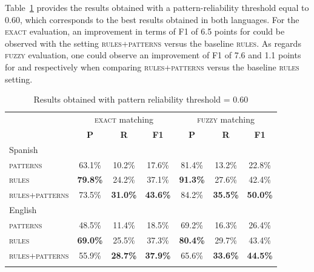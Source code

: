 \documentclass[output=paper]{langsci/langscibook}
\begin{document}
Table~\ref{jac:tab:EvalPatterns} provides the results obtained with a pattern-reliability threshold equal to 0.60, which corresponds to the best results obtained in both languages. For the \textsc{exact} evaluation, an improvement in terms of F1 of 6.5 points for  could be observed with the setting \textsc{rules+patterns} versus the baseline \textsc{rules}. As regards \textsc{fuzzy} evaluation, one could observe an improvement of F1 of 7.6 and 1.1 points for  and  respectively when comparing \textsc{rules+patterns} versus the baseline \textsc{rules} setting.


\begin{table}[h]
\begin{tabular}{l ccc ccc}\lsptoprule
&     \multicolumn{3}{c}{\textsc{exact} matching}  & \multicolumn{3}{c}{\textsc{fuzzy} matching}  \\\cmidrule(lr){2-4}\cmidrule(lr){5-7}
&  \textbf{P}  & \textbf{R}  &  \textbf{F1}  &  \textbf{P}  & \textbf{R}  &  \textbf{F1} \\ 
\midrule
\textnormal{Spanish}                        & & &  & & &   \\
\textsc{patterns}                &     63.1\% & 10.2\% & 17.6\% & 81.4\% & 13.2\% & 22.8\%  \\  
\textsc{rules}   &  \textbf{79.8\%} & 24.2\% & 37.1\% & \textbf{91.3\%} & 27.6\% & 42.4\%  \\
\textsc{rules+patterns}  &     73.5\% & \textbf{31.0\%} & \textbf{43.6\%} & 84.2\% & \textbf{35.5\%} & \textbf{50.0\%}  \\ 
\midrule
\textnormal{English}                        & & & &  & &   \\
\textsc{patterns}                &     48.5\% & 11.4\% & 18.5\% & 69.2\% & 16.3\% & 26.4\%   \\  
\textsc{rules}   &  \textbf{69.0\%} & 25.5\% & 37.3\% & \textbf{80.4\%} & 29.7\% & 43.4\%  \\
\textsc{rules+patterns}  &     55.9\% & \textbf{28.7\%} & \textbf{37.9\%} & 65.6\% & \textbf{33.6\%} & \textbf{44.5\%}  \\ 
\lspbottomrule
\end{tabular}
\caption{Results obtained with pattern reliability threshold = 0.60}
\label{jac:tab:EvalPatterns}
\end{table}
\end{document}
